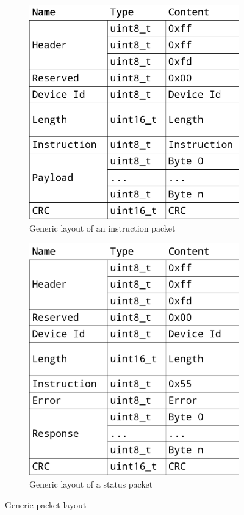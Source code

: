 \begin{figure}[h]
    \centering

    \begin{subfigure}[t]{0.5\textwidth}
        \centering
        \includegraphics[scale=0.19]{img/packet.png}
        \caption{Generic layout of an instruction packet}
    \end{subfigure}%
    \begin{subfigure}[t]{0.5\textwidth}
        \centering
        \includegraphics[scale=0.19]{img/status_packet.png}
        \caption{Generic layout of a status packet}
    \end{subfigure}

    \caption{Generic packet layout}
\end{figure}

